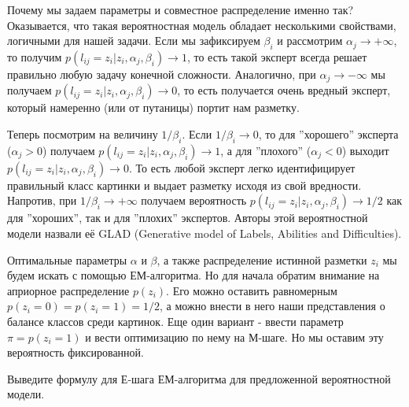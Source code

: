 \documentclass[12pt,a4paper]{article}
\begin{document}
\par Почему мы задаем параметры и совместное распределение именно так? Оказывается, что такая вероятностная модель обладает несколькими свойствами, логичными для нашей задачи. Если мы зафиксируем $\beta_i$ и рассмотрим $\alpha_j \rightarrow +\infty$, то получим $p(l_{ij} = z_{i}| z_{i}, \alpha_j, \beta_i) \rightarrow 1$, то есть такой эксперт всегда решает правильно любую задачу конечной сложности. Аналогично, при $\alpha_j \rightarrow -\infty$ мы получаем $p(l_{ij} = z_{i}| z_{i}, \alpha_j, \beta_i) \rightarrow 0$, то есть получается очень вредный эксперт, который намеренно (или от путаницы) портит нам разметку.

\par Теперь посмотрим на величину $1/\beta_i$. Если $1/\beta_i \rightarrow 0$, то для ''хорошего'' эксперта ($\alpha_j > 0$) получаем $p(l_{ij} = z_{i}| z_{i}, \alpha_j, \beta_i) \rightarrow 1$, а для ''плохого'' ($\alpha_j < 0$) выходит $p(l_{ij} = z_{i}| z_{i}, \alpha_j, \beta_i) \rightarrow 0$. То есть любой эксперт легко идентифицирует правильный класс картинки и выдает разметку исходя из свой вредности. Напротив, при $1/\beta_i \rightarrow +\infty$ получаем вероятность $p(l_{ij} = z_{i}| z_{i}, \alpha_j, \beta_i) \rightarrow 1/2$ как для ''хороших'', так и для ''плохих'' экспертов. Авторы этой вероятностной модели назвали её GLAD (Generative model of Labels, Abilities and Difficulties).

\par Оптимальные параметры $\alpha$ и $\beta$, а также распределение истинной разметки $z_i$ мы будем искать с помощью ЕМ-алгоритма. Но для начала обратим внимание на априорное распределение $p(z_i)$. Его можно оставить равномерным $p(z_i = 0) = p(z_i = 1) = 1/2$, а можно внести в него наши представления о балансе классов среди картинок. Еще один вариант - ввести параметр $\pi = p(z_i = 1)$ и вести оптимизацию по нему на М-шаге. Но мы оставим эту вероятность фиксированной.

\begin{vkProblem}
    Выведите формулу для Е-шага ЕМ-алгоритма для предложенной вероятностной модели.
\end{vkProblem}
\end{document}

